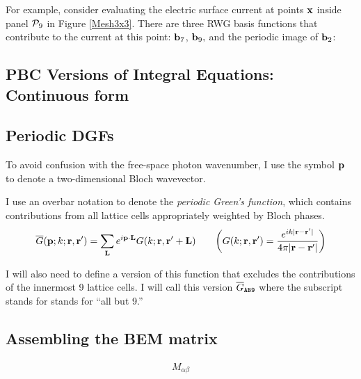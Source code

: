 For example, consider evaluating the electric surface current at 
points $\mathbf{x}$ inside panel $\mathcal{P}_9$ in Figure \ref{Mesh3x3}.
There are three RWG basis functions that contribute to the current
at this point: $\mathbf{b}_7$, $\mathbf{b}_9,$ and the periodic image of 
$\mathbf{b}_2$:

\subsection{PBC Versions of Integral Equations: Continuous form}

\subsection{Periodic DGFs}

To avoid confusion with the free-space photon wavenumber, 
I use the symbol $\mathbf{p}$ to denote a two-dimensional 
Bloch wavevector.

I use an overbar notation to denote the 
\textit{periodic Green's function}, which contains contributions
from all lattice cells appropriately weighted by Bloch phases.
$$
  \overline{G}(\mathbf{p}; k; \mathbf{r}, \mathbf{r}^\prime)
= \sum_{\mathbf{L}} e^{i \mathbf{p} \cdot \mathbf{L}} G(k; \mathbf{r}, \mathbf{r}^\prime+\mathbf{L})
\qquad 
 \bigg( G(k; \mathbf{r}, \mathbf{r}^\prime) 
 = \frac{e^{ik|\mathbf{r}-\mathbf{r}^\prime|}}{4\pi|\mathbf{r}-\mathbf{r}^\prime|}
 \bigg)
$$

I will also need to define a version of this function that 
excludes the contributions of the innermost 9 lattice cells.
I will call this version 
$\overline{G}_{\texttt{AB9}}$
where the subscript stands for 
stands for ``all but 9.''

\subsection{Assembling the BEM matrix}

\begin{align*}
M_{\alpha\beta}
\end{align*}
